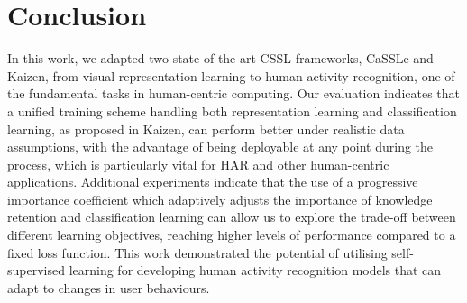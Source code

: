 \section{Conclusion}
In this work, we adapted two state-of-the-art CSSL frameworks, CaSSLe and Kaizen, from visual representation learning to human activity recognition, one of the fundamental tasks in human-centric computing. Our evaluation indicates that a unified training scheme handling both representation learning and classification learning, as proposed in Kaizen, can perform better under realistic data assumptions, with the advantage of being deployable at any point during the process, which is particularly vital for HAR and other human-centric applications. Additional experiments indicate that the use of a progressive importance coefficient which adaptively adjusts the importance of knowledge retention and classification learning can allow us to explore the trade-off between different learning objectives, reaching higher levels of performance compared to a fixed loss function. This work demonstrated the potential of utilising self-supervised learning for developing human activity recognition models that can adapt to changes in user behaviours.
